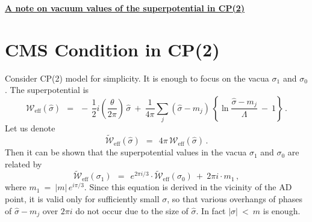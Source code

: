 \documentclass[12pt]{article}
\def\beq{\begin{equation}}
\def\eeq{\end{equation}}
\newcommand{\mc}[1]{\mathcal{#1}}
\newcommand{\hsigma}{{\hat{\sigma}}}
\newcommand{\ww}{\tilde{\mc{W}}{}_\text{eff}}
\begin{document}
{\bf\centering
\large\underline{A note on vacuum values of the superpotential in CP(2)}}

\section*{CMS Condition in CP(2)}
	Consider CP(2) model for simplicity.
	It is enough to focus on the vacua $ \sigma_1 $ and $ \sigma_0 $. 
	The superpotential is
\beq
\label{Weff}
	\mc{W}_\text{eff} (\hsigma) ~~=~~-\, \frac{1}{2}i \left(\frac{\theta}{2\pi}\right)\, \hsigma ~+~
		\frac{1}{4\pi} \sum_j (\hsigma - m_j)\, 
					\left\{ \ln \frac{\hsigma - m_j}{\Lambda} ~-~ 1 \right\}\,.
\eeq
	Let us denote
\beq
	\ww (\hsigma) ~~=~~ 4\pi\, \mc{W}_\text{eff} (\hsigma)\,.
\eeq
	Then it can be shown that the superpotential values in the vacua $ \sigma_1 $ and 
	$ \sigma_0 $ are related by
\beq
\label{w1}
	\ww (\sigma_1) ~~=~~ e^{2\pi i /3 } \cdot \ww (\sigma_0) ~+~ 2\pi i \cdot m_1\,,
\eeq
	where $ m_1 ~=~ |m|\,e^{i \pi /3 } $.
	Since this equation is derived in the vicinity of the AD point, 
	it is valid only for sufficiently small $ \sigma $, so that various overhangs
	of phases of $ \hsigma - m_j $ over $ 2\pi i $ do not occur due to the size of $ \hsigma $.
	In fact $ |\sigma| ~<~ m $ is enough.
\end{document}
